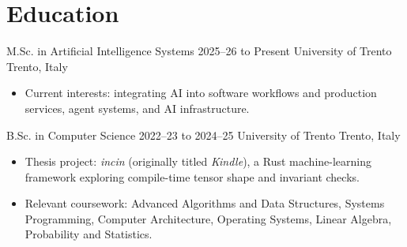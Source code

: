 \section{Education}

\cveducation
  {M.Sc. in Artificial Intelligence Systems}
  {2025--26 to Present}
  {University of Trento}
  {Trento, Italy}
  {
    \begin{itemize}
      \item Current interests: integrating AI into software workflows and production services, agent systems, and AI infrastructure.
    \end{itemize}
  }

\cveducation
  {B.Sc. in Computer Science}
  {2022--23 to 2024--25}
  {University of Trento}
  {Trento, Italy}
  {
    \begin{itemize}
      \item Thesis project: \textit{incin} (originally titled \textit{Kindle}), a Rust machine-learning framework exploring compile-time tensor shape and invariant checks.
      \item Relevant coursework: Advanced Algorithms and Data Structures, Systems Programming, Computer Architecture, Operating Systems, Linear Algebra, Probability and Statistics.
    \end{itemize}
  }

